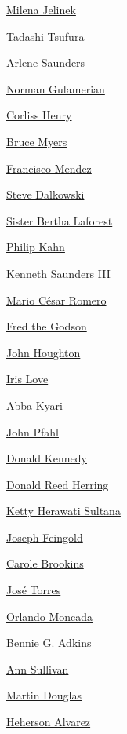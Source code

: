 \protect\hyperlink{milena-jelinek}{Milena Jelinek}

\protect\hyperlink{tadashi-tsufura}{Tadashi Tsufura}

\protect\hyperlink{arlene-saunders}{Arlene Saunders}

\protect\hyperlink{norman-gulamerian}{Norman Gulamerian}

\protect\hyperlink{corliss-henry}{Corliss Henry}

\protect\hyperlink{bruce-myers}{Bruce Myers}

\protect\hyperlink{francisco-mendez}{Francisco Mendez}

\protect\hyperlink{steve-dalkowski}{Steve Dalkowski}

\protect\hyperlink{sister-bertha-laforest}{Sister Bertha Laforest}

\protect\hyperlink{philip-kahn}{Philip Kahn}

\protect\hyperlink{kenneth-saunders-iii}{Kenneth Saunders III}

\protect\hyperlink{mario-cuxe9sar-romero}{Mario César Romero}

\protect\hyperlink{fred-the-godson}{Fred the Godson}

\protect\hyperlink{john-houghton}{John Houghton}

\protect\hyperlink{iris-love}{Iris Love}

\protect\hyperlink{abba-kyari}{Abba Kyari}

\protect\hyperlink{john-pfahl}{John Pfahl}

\protect\hyperlink{donald-kennedy}{Donald Kennedy}

\protect\hyperlink{donald-reed-herring}{Donald Reed Herring}

\protect\hyperlink{ketty-herawati-sultana}{Ketty Herawati Sultana}

\protect\hyperlink{joseph-feingold}{Joseph Feingold}

\protect\hyperlink{carole-brookins}{Carole Brookins}

\protect\hyperlink{josuxe9-torres}{José Torres}

\protect\hyperlink{orlando-moncada}{Orlando Moncada}

\protect\hyperlink{bennie-g-adkins}{Bennie G. Adkins}

\protect\hyperlink{ann-sullivan}{Ann Sullivan}

\protect\hyperlink{martin-douglas}{Martin Douglas}

\protect\hyperlink{heherson-alvarez}{Heherson Alvarez}

